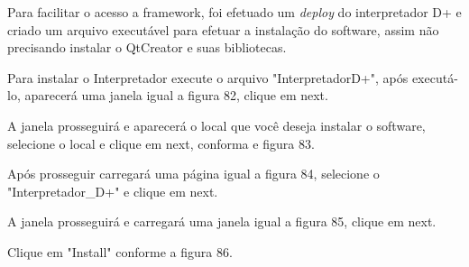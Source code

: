 \documentclass[12pt,oneside,a4paper,chapter=TITLE,section=TITLE,sumario=tradicional]{abntex2}
\begin{document}
\begin{figure}[htb]
\end{figure}


Para facilitar o acesso a framework, foi efetuado um \textit{deploy} do interpretador D+ e criado um arquivo executável para efetuar a instalação do software, assim não precisando instalar o QtCreator e suas bibliotecas.

Para instalar o Interpretador execute o arquivo "InterpretadorD+", após executá-lo, aparecerá uma janela igual a figura 82, clique em next.

\begin{figure}[!htb]
\end{figure}

A janela prosseguirá e aparecerá o local que você deseja instalar o software, selecione o local e clique em next, conforma e figura 83.

\begin{figure}[H]
\end{figure}

Após prosseguir carregará uma página igual a figura 84, selecione o "Interpretador\_D+" e clique em next.

\begin{figure}[H]
\end{figure}

A janela prosseguirá e carregará uma janela igual a figura 85, clique em next.

\begin{figure}[H]
\end{figure}

Clique em "Install" conforme a figura 86.

\begin{figure}[H]
\end{figure}
\end{document}
